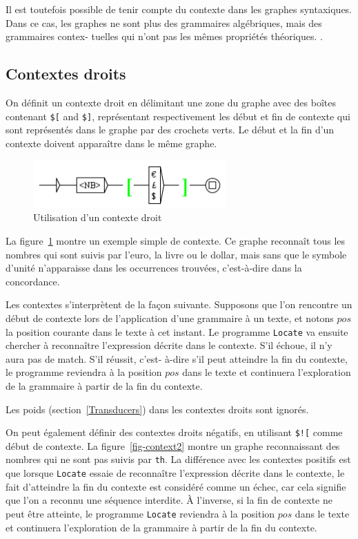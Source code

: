 \bigskip
\noindent Il est toutefois possible de tenir compte du contexte dans les graphes syntaxiques. Dans
ce cas, les graphes ne sont plus des grammaires algébriques, mais des grammaires contex-
tuelles qui n’ont pas les mêmes propriétés théoriques.
.

\subsection{Contextes droits}
\index{\verb+$[+}
\index{\verb+$]+}
On définit un contexte droit en délimitant une zone du graphe avec des boîtes contenant
\verb+$[+ and \verb+$]+, représentant respectivement les début et fin de contexte qui sont
représentés dans le graphe par des crochets verts. Le début et la fin d’un contexte doivent
apparaître dans le même graphe.


\bigskip
\begin{figure}[!h]
\begin{center}
\includegraphics[width=7.4cm]{resources/img/fig6-12.png}
\caption{Utilisation d’un contexte droit\label{fig-context1}}
\end{center}
\end{figure}

\bigskip
\noindent La figure~\ref{fig-context1} montre un exemple simple de contexte. Ce graphe
reconnaît tous les nombres qui sont suivis par l’euro, la livre ou le dollar, mais sans
que le symbole d’unité n’apparaisse dans les occurrences trouvées, c'est-à-dire dans
la concordance.

\bigskip
\noindent Les contextes s’interprètent de la façon suivante. Supposons que l’on rencontre un début
de contexte lors de l’application d’une grammaire à un texte, et notons $pos$ la position courante
dans le texte à cet instant. Le programme \verb$Locate$ va ensuite chercher à reconnaître
l’expression décrite dans le contexte. S’il échoue, il n’y aura pas de match. S’il réussit, c’est-
à-dire s’il peut atteindre la fin du contexte, le programme reviendra à la position $pos$ dans
le texte et continuera l’exploration de la grammaire à partir de la fin du contexte.

\bigskip
\noindent Les poids (section~\ref{Transducers}) dans les contextes droits sont ignorés.

\bigskip
\noindent On peut également définir des contextes droits négatifs, en utilisant
 \verb+$![+ comme début de contexte. La figure~\ref{fig-context2}
montre un graphe reconnaissant des nombres qui ne sont pas suivis par \verb+th+.
 La différence avec les contextes positifs est que lorsque \verb$Locate$ essaie de reconnaître
 l’expression décrite dans le contexte, le fait d’atteindre la fin du
 contexte est considéré comme un échec, car cela signifie que l’on a reconnu une séquence interdite.
 À l’inverse, si la fin de contexte ne peut être atteinte, le programme \verb$Locate$ reviendra à
 la position $pos$ dans le texte et continuera l’exploration de la grammaire à partir de la fin du
 contexte.

